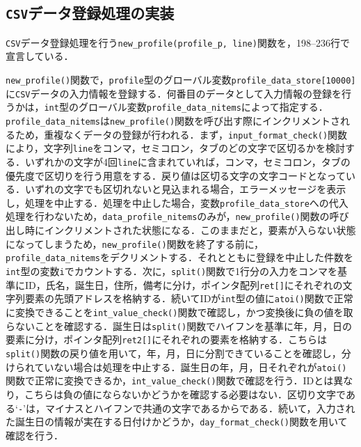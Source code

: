 \subsection{\texttt{CSV}データ登録処理の実装}

\verb|CSV|データ登録処理を行う\verb|new_profile(profile_p, line)|関数を，198--236行で宣言している．

\verb|new_profile()|関数で，\verb|profile|型のグローバル変数\verb|profile_data_store[10000]|に\verb|CSV|データの入力情報を登録する．何番目のデータとして入力情報の登録を行うかは，\verb|int|型のグローバル変数\verb|profile_data_nitems|によって指定する．\verb|profile_data_nitems|は\verb|new_profile()|関数を呼び出す際にインクリメントされるため，重複なくデータの登録が行われる．まず，\verb|input_format_check()|関数により，文字列\verb|line|をコンマ，セミコロン，タブのどの文字で区切るかを検討する．いずれかの文字が4回\verb|line|に含まれていれば，コンマ，セミコロン，タブの優先度で区切りを行う用意をする．戻り値は区切る文字の文字コードとなっている．いずれの文字でも区切れないと見込まれる場合，エラーメッセージを表示し，処理を中止する．処理を中止した場合，変数\verb|profile_data_store|への代入処理を行わないため，\verb|data_profile_nitems|のみが，\verb|new_profile()|関数の呼び出し時にインクリメントされた状態になる．このままだと，要素が入らない状態になってしまうため，\verb|new_profile()|関数を終了する前に，\verb|profile_data_nitems|をデクリメントする．それとともに登録を中止した件数を\verb|int|型の変数\verb|i|でカウントする．次に，\verb|split()|関数で1行分の入力をコンマを基準にID，氏名，誕生日，住所，備考に分け，ポインタ配列\verb|ret[]|にそれぞれの文字列要素の先頭アドレスを格納する．続いてIDが\verb|int|型の値に\verb|atoi()|関数で正常に変換できることを\verb|int_value_check()|関数で確認し，かつ変換後に負の値を取らないことを確認する．誕生日は\verb|split()|関数でハイフンを基準に年，月，日の要素に分け，ポインタ配列\verb|ret2[]|にそれぞれの要素を格納する．こちらは\verb|split()|関数の戻り値を用いて，年，月，日に分割できていることを確認し，分けられていない場合は処理を中止する．誕生日の年，月，日それぞれが\verb|atoi()|関数で正常に変換できるか，\verb|int_value_check()|関数で確認を行う．IDとは異なり，こちらは負の値にならないかどうかを確認する必要はない．区切り文字である‘\verb|-|’は，マイナスとハイフンで共通の文字であるからである．続いて，入力された誕生日の情報が実在する日付けかどうか，\verb|day_format_check()|関数を用いて確認を行う．

